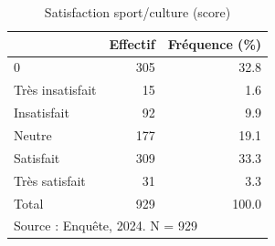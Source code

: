 \begin{table}[htbp]\centering
\def\sym#1{\ifmmode^{#1}\else\(^{#1}\)\fi}
\caption{Satisfaction sport/culture (score)}
\begin{tabular}{l*{2}{r}}
\toprule
            &    Effectif&Fréquence (\%)\\
\midrule
0           &         305&        32.8\\
Très insatisfait&          15&         1.6\\
Insatisfait &          92&         9.9\\
Neutre      &         177&        19.1\\
Satisfait   &         309&        33.3\\
Très satisfait&          31&         3.3\\
Total       &         929&       100.0\\
\bottomrule
\multicolumn{3}{l}{\footnotesize Source : Enquête, 2024. N = 929}\\
\end{tabular}
\end{table}
